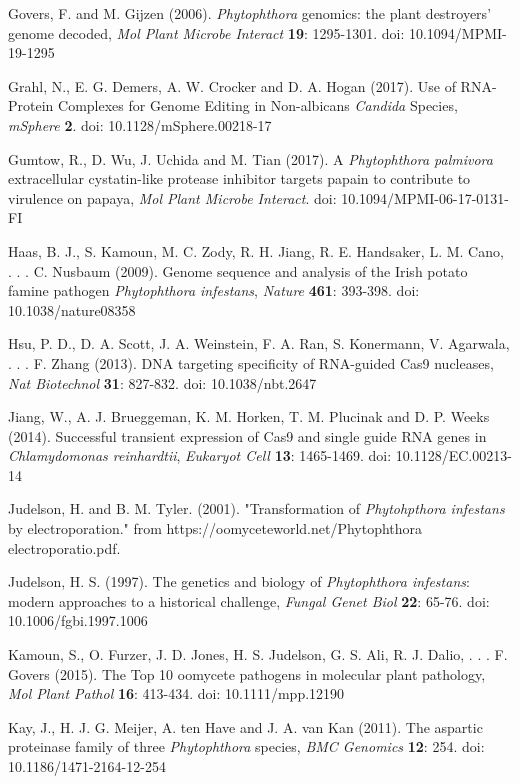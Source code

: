 \documentclass[onecolumn, 11pt,openany]{memoir}
\begin{document}
\begin{multicols}{2}
\begin{sloppy}
\begin{footnotesize}
Govers, F. and M. Gijzen (2006). \textit{Phytophthora }genomics: the plant destroyers' genome decoded, \textit{Mol Plant Microbe Interact} \textbf{19}: 1295-1301. doi: 10.1094/MPMI-19-1295

Grahl, N., E. G. Demers, A. W. Crocker and D. A. Hogan (2017). Use of RNA-Protein Complexes for Genome Editing in Non-albicans \textit{Candida} Species, \textit{mSphere} \textbf{2}. doi: 10.1128/mSphere.00218-17

Gumtow, R., D. Wu, J. Uchida and M. Tian (2017). A \textit{Phytophthora palmivora} extracellular cystatin-like protease inhibitor targets papain to contribute to virulence on papaya, \textit{Mol Plant Microbe Interact}. doi: 10.1094/MPMI-06-17-0131-FI

Haas, B. J., S. Kamoun, M. C. Zody, R. H. Jiang, R. E. Handsaker, L. M. Cano, . . . C. Nusbaum (2009). Genome sequence and analysis of the Irish potato famine pathogen \textit{Phytophthora infestans}, \textit{Nature} \textbf{461}: 393-398. doi: 10.1038/nature08358

Hsu, P. D., D. A. Scott, J. A. Weinstein, F. A. Ran, S. Konermann, V. Agarwala, . . . F. Zhang (2013). DNA targeting specificity of RNA-guided Cas9 nucleases, \textit{Nat Biotechnol} \textbf{31}: 827-832. doi: 10.1038/nbt.2647

Jiang, W., A. J. Brueggeman, K. M. Horken, T. M. Plucinak and D. P. Weeks (2014). Successful transient expression of Cas9 and single guide RNA genes in \textit{Chlamydomonas reinhardtii}, \textit{Eukaryot Cell} \textbf{13}: 1465-1469. doi: 10.1128/EC.00213-14

Judelson, H. and B. M. Tyler. (2001). "Transformation of \textit{Phytohpthora infestans }by electroporation." from https://oomyceteworld.net/Phytophthora electroporatio.pdf.

Judelson, H. S. (1997). The genetics and biology of \textit{Phytophthora infestans}: modern approaches to a historical challenge, \textit{Fungal Genet Biol} \textbf{22}: 65-76. doi: 10.1006/fgbi.1997.1006

Kamoun, S., O. Furzer, J. D. Jones, H. S. Judelson, G. S. Ali, R. J. Dalio, . . . F. Govers (2015). The Top 10 oomycete pathogens in molecular plant pathology, \textit{Mol Plant Pathol} \textbf{16}: 413-434. doi: 10.1111/mpp.12190

Kay, J., H. J. G. Meijer, A. ten Have and J. A. van Kan (2011). The aspartic proteinase family of three \textit{Phytophthora }species, \textit{BMC Genomics} \textbf{12}: 254. doi: 10.1186/1471-2164-12-254


\end{footnotesize}
\end{sloppy}
\end{multicols}
\end{document}
